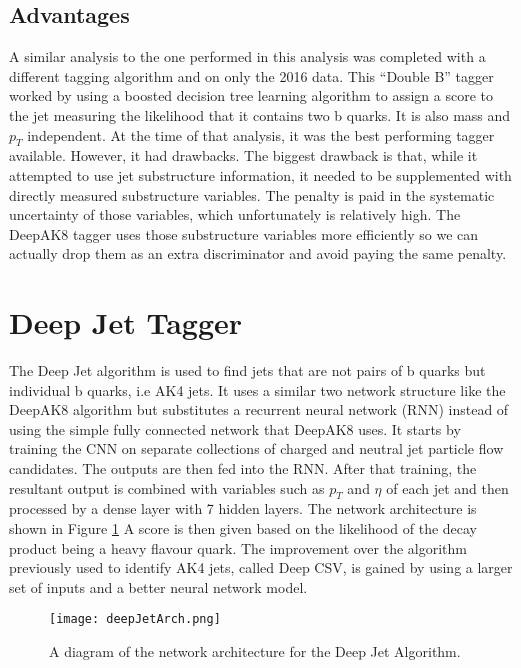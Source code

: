 \subsection{Advantages}

A similar analysis to the one performed in this analysis was completed with a different tagging algorithm and on only the 2016 data.
This ``Double B'' tagger worked by using a boosted decision tree learning algorithm to assign a score to the jet measuring the likelihood that it contains two b quarks.
It is also mass and $p_T$ independent. At the time of that analysis, it was the best performing tagger available. However, it had drawbacks.
The biggest drawback is that, while it attempted to use jet substructure information, it needed to be supplemented with directly measured substructure variables.
The penalty is paid in the systematic uncertainty of those variables, which unfortunately is relatively high.
The DeepAK8 tagger uses those substructure variables more efficiently so we can actually drop them as an extra discriminator and avoid paying the same penalty.

\section{Deep Jet Tagger}

The Deep Jet algorithm is used to find jets that are not pairs of b quarks but individual b quarks, i.e AK4 jets. 
It uses a similar two network structure like the DeepAK8 algorithm but substitutes a recurrent neural network (RNN) instead of using the simple fully connected network that DeepAK8 uses.
It starts by training the CNN on separate collections of charged and neutral jet particle flow candidates. 
The outputs are then fed into the RNN. After that training, the resultant output is combined with variables such as $p_T$ and $\eta$ of each jet and then processed by a dense layer with 7 hidden layers.
The network architecture is shown in Figure \ref{fig:fig_4-4}
A score is then given based on the likelihood of the decay product being a heavy flavour quark. The improvement over the algorithm previously used to identify AK4 jets, called Deep CSV, is gained by using a larger set of inputs and a better neural network model.
\begin{figure} %
    \centering
    \texttt{[image: deepJetArch.png]}
    \caption{A diagram of the network architecture for the Deep Jet Algorithm.}
    \label{fig:fig_4-4}
 \end{figure}
